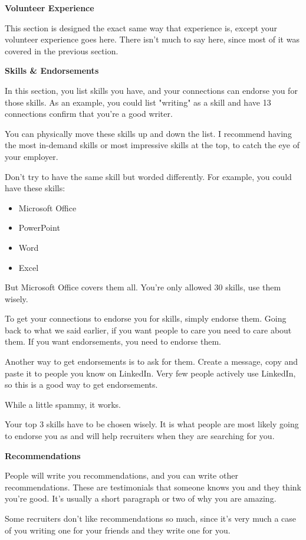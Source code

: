 \documentclass{article}
\begin{document}
\textbf{Volunteer Experience}

This section is designed the exact same way that experience is, except
your volunteer experience goes here. There isn't much to say here, since
most of it was covered in the previous section.

\textbf{Skills \& Endorsements}

In this section, you list skills you have, and your connections can
endorse you for those skills. As an example, you could list "writing"
as a skill and have 13 connections confirm that you're a good writer.

You can physically move these skills up and down the list. I recommend
having the most in-demand skills or most impressive skills at the top,
to catch the eye of your employer.

Don't try to have the same skill but worded differently. For example,
you could have these skills:
\begin{itemize}
\item
  Microsoft Office
\item
  PowerPoint
\item
  Word
\item
  Excel
\end{itemize}

But Microsoft Office covers them all. You're only allowed 30 skills, use
them wisely.

To get your connections to endorse you for skills, simply endorse them.
Going back to what we said earlier, if you want people to care you need
to care about them. If you want endorsements, you need to endorse them.

Another way to get endorsements is to ask for them. Create a message,
copy and paste it to people you know on LinkedIn. Very few people
actively use LinkedIn, so this is a good way to get endorsements.

While a little spammy, it works.

Your top 3 skills have to be chosen wisely. It is what people are most
likely going to endorse you as and will help recruiters when they are
searching for you.

\textbf{Recommendations}

People will write you recommendations, and you can write other
recommendations. These are testimonials that someone knows you and they
think you're good. It's usually a short paragraph or two of why you are
amazing.

Some recruiters don't like recommendations so much, since it's very much
a case of you writing one for your friends and they write one for you.
\end{document}
